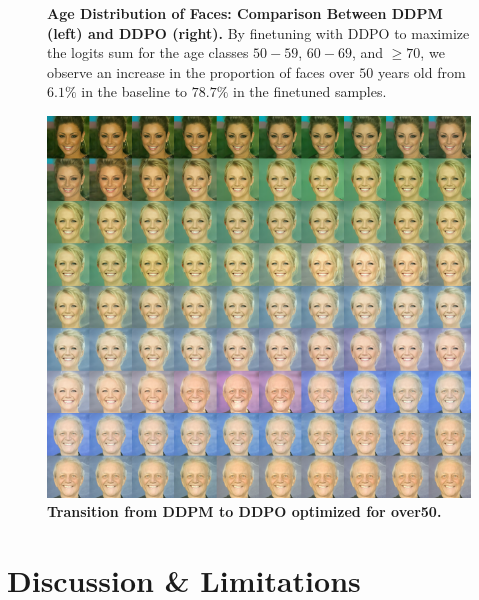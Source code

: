 \begin{figure}[ht]
\begin{minipage}{0.5\textwidth}
  \end{minipage}
  \vspace{-8pt}  %
  \captionsetup{width=\textwidth} %
  \caption{\textbf{Age Distribution of Faces: Comparison Between DDPM (left) and DDPO (right).} By finetuning with DDPO to maximize the logits sum for the age classes 
  \texttt{$50-59$}, \texttt{$60-69$}, and \texttt{$\geq 70$}, we observe an increase in the proportion of faces over $50$ years old from $6.1\%$ in the baseline to $78.7\%$ in the finetuned samples.}
  \label{fig:age-face-dist} 
\end{figure}


\begin{figure}[ht]
  \centering
  \includegraphics[scale=2.80]{img/results/over50_47.png}
  \vspace{-0pt}  %
    \captionsetup{width=\textwidth} %
    \caption{\textbf{Transition from DDPM to DDPO optimized for over50.}}
    \label{fig:ddpm-to-ddpo-over50}
\end{figure}




\section{Discussion \& Limitations}

